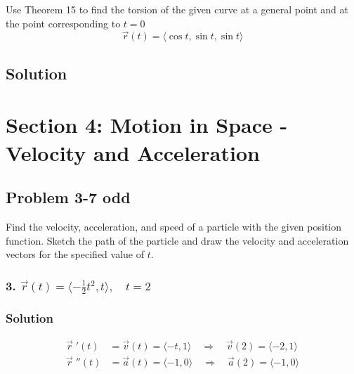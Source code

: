 \documentclass{article}
\newcommand{\rvec}{\vec{r}(t)}
\newcommand{\drvec}{\vec{r}\;'(t)}
\begin{document}
Use Theorem 15 to find the torsion of the given curve at a general point and at the point corresponding to $t = 0$
\[
    \rvec = \langle{\cos{t}, \sin{t}, \sin{t}}\rangle
\]
\subsection*{Solution}

\section*{Section 4: Motion in Space - Velocity and Acceleration}
\subsection*{Problem 3-7 odd}

Find the velocity, acceleration, and speed of a particle with the given position function. Sketch the path of the particle and draw the velocity and acceleration vectors for the specified value of $t$.

\subsubsection*{3. $\rvec = \langle -\frac 1 2 t^2, t \rangle, \quad t = 2$}
\subsubsection*{Solution}
\begin{align*}
    \drvec &= \vec v (t) = \langle -t, 1 \rangle \quad \Rightarrow \quad \vec v (2) = \langle -2, 1 \rangle \\
    \vec r \;''(t) &= \vec a (t) = \langle -1, 0 \rangle \quad\Rightarrow \quad \vec a (2) = \langle -1, 0\rangle 
\end{align*}
\end{document}
